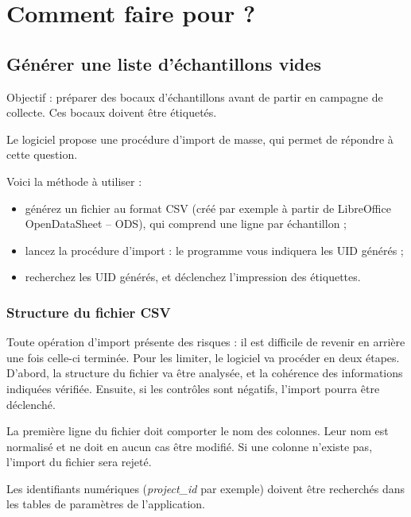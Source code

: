 \chapter{Comment faire pour ?}
\section{Générer une liste d'échantillons vides}
Objectif : préparer des bocaux d'échantillons avant de partir en campagne de collecte. Ces bocaux doivent être étiquetés.

Le logiciel propose une procédure d'import de masse, qui permet de répondre à cette question.

Voici la méthode à utiliser :
\begin{itemize}
\item générez un fichier au format CSV (créé par exemple à partir de LibreOffice OpenDataSheet -- ODS), qui comprend une ligne par échantillon ;
\item lancez la procédure d'import : le programme vous indiquera les UID générés ;
\item recherchez les UID générés, et déclenchez l'impression des étiquettes.
\end{itemize}

\subsection{Structure du fichier CSV}

Toute opération d'import présente des risques : il est difficile de revenir en arrière une fois celle-ci terminée.
Pour les limiter, le logiciel va procéder en deux étapes. D'abord, la structure du fichier va être analysée, et la cohérence des informations indiquées vérifiée.
Ensuite, si les contrôles sont négatifs, l'import pourra être déclenché.

La première ligne du fichier doit comporter le nom des colonnes. Leur nom est normalisé et ne doit en aucun cas être modifié. Si une colonne n'existe pas, l'import du fichier sera rejeté.

Les identifiants numériques (\textit{project\_id} par exemple) doivent être recherchés dans les tables de paramètres de l'application.


